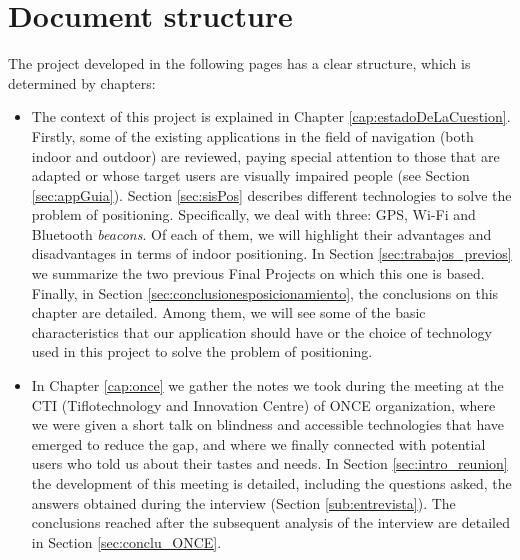 \section{Document structure}

The project developed in the following pages has a clear structure, which is determined by chapters:

\begin{itemize}
	
	\item The context of this project is explained in Chapter \ref{cap:estadoDeLaCuestion}. Firstly, some of the existing applications in the field of navigation (both indoor and outdoor) are reviewed, paying special attention to those that are adapted or whose target users are visually impaired people (see Section \ref{sec:appGuia}). Section \ref{sec:sisPos} describes different technologies to solve the problem of positioning. Specifically, we deal with three: GPS, Wi-Fi and Bluetooth \textit{beacons}. Of each of them, we will highlight their advantages and disadvantages in terms of indoor positioning. In Section \ref{sec:trabajos_previos} we summarize the two previous Final Projects on which this one is based. Finally, in Section \ref{sec:conclusionesposicionamiento}, the conclusions on this chapter are detailed. Among them, we will see some of the basic characteristics that our application should have or the choice of technology used in this project to solve the problem of positioning. 
	
	\item In Chapter \ref{cap:once} we gather the notes we took during the meeting at the CTI (Tiflotechnology and Innovation Centre) of ONCE organization, where we were given a short talk on blindness and accessible technologies that have emerged to reduce the gap, and where we finally connected with potential users who told us about their tastes and needs. In Section \ref{sec:intro_reunion} the development of this meeting is detailed, including the questions asked, the answers obtained during the interview (Section \ref{sub:entrevista}). The conclusions reached after the subsequent analysis of the interview are detailed in Section \ref{sec:conclu_ONCE}. 
	

\end{itemize}
